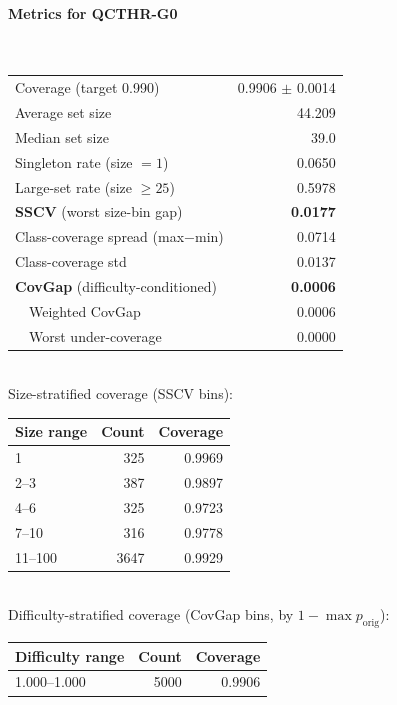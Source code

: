 \documentclass[parskip=half]{scrartcl}
\begin{document}
\paragraph{Metrics for QCTHR-G0}~\\
\begin{tabular}{l r}
\hline
Coverage (target 0.990) & 0.9906 $\pm$ 0.0014 \\
Average set size & 44.209 \\
Median set size & 39.0 \\
Singleton rate (size $=1$) & 0.0650 \\
Large-set rate (size $\geq 25$) & 0.5978 \\
\textbf{SSCV} (worst size-bin gap) & \textbf{0.0177} \\
Class-coverage spread (max$-$min) & 0.0714 \\
Class-coverage std & 0.0137 \\
\textbf{CovGap} (difficulty-conditioned) & \textbf{0.0006} \\
~~Weighted CovGap & 0.0006 \\
~~Worst under-coverage & 0.0000 \\
\hline
\end{tabular}\\[0.5em]
\textsf{\scriptsize Size-stratified coverage (SSCV bins):}\\
\begin{tabular}{l r r}
\hline
Size range & Count & Coverage \\
\hline
1 & 325 & 0.9969 \\
2--3 & 387 & 0.9897 \\
4--6 & 325 & 0.9723 \\
7--10 & 316 & 0.9778 \\
11--100 & 3647 & 0.9929 \\
\hline
\end{tabular}\\[0.5em]
\textsf{\scriptsize Difficulty-stratified coverage (CovGap bins, by $1-\max p_{\mathrm{orig}}$):}\\
\begin{tabular}{l r r}
\hline
Difficulty range & Count & Coverage \\
\hline
1.000--1.000 & 5000 & 0.9906 \\
\hline
\end{tabular}\\[0.5em]
\end{document}
